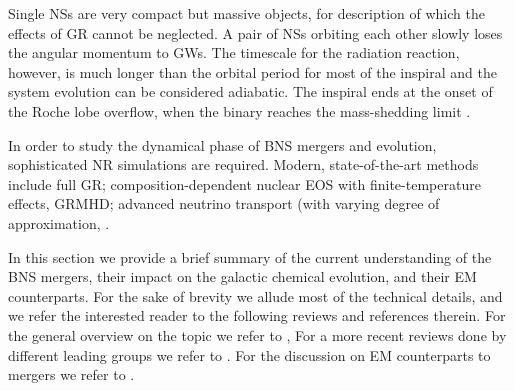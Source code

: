 Single \acp{NS} are very compact but massive objects, 
for description of which the effects of \ac{GR} cannot be neglected.
A pair of \acp{NS} orbiting each other slowly loses the 
angular momentum to \acp{GW}. The timescale for the radiation reaction, however, 
is much longer than the orbital period for most of the inspiral and the 
system evolution can be considered adiabatic. 
The inspiral ends at the onset of the Roche lobe overflow, when the binary 
reaches the mass-shedding limit \citep{Bejger:2004zx}.

In order to study the dynamical phase of \ac{BNS} mergers and \pmerg{} evolution, 
sophisticated \ac{NR} simulations are required. Modern, state-of-the-art methods 
include full \ac{GR}; composition-dependent nuclear \ac{EOS} with finite-temperature 
effects, \ac{GRMHD}; advanced neutrino transport (with varying degree of approximation,
\citep{Sekiguchi:2011zd, Wanajo:2014wha, Foucart:2015gaa, Palenzuela:2015dqa, Sekiguchi:2016bjd, Kiuchi:2017zzg, Radice:2017zta, Fujibayashi:2017puw}.


In this section we provide a brief summary of the current understanding of the 
\ac{BNS} mergers, their impact on the galactic chemical evolution, and their 
\ac{EM} counterparts. For the sake of brevity we allude most of the technical details, 
and we refer the interested reader to the following reviews and references therein.
%
For the general overview on the topic we refer to \citet{Shibata:2016},
For a more recent reviews done by different leading groups we refer to 
\citet{Radice:2020ddv,Bernuzzi:2020tgt,Shibata:2019wef}.
%
For the discussion on \ac{EM} counterparts to mergers we refer to 
\citet{Kumar:2014upa,Fernandez:2015use,Metzger:2019zeh}.

